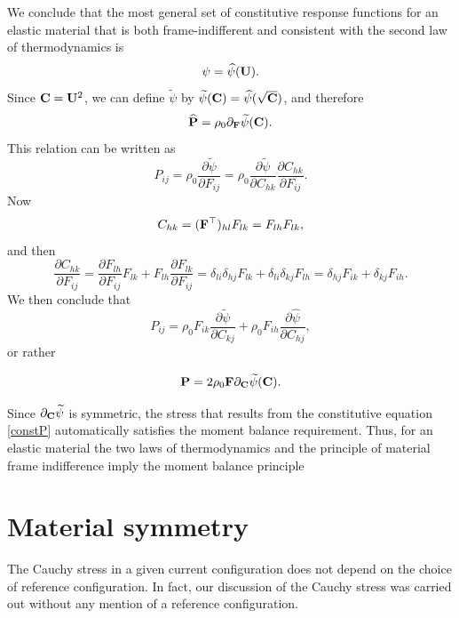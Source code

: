 We conclude that the most general set of constitutive response functions for an elastic material
that is both frame-indifferent and consistent with the second law of thermodynamics is
\begin{equation}
	\psi=\widehat{\psi}(\mathbf{U}).
\end{equation}
Since $\mathbf{C}=\mathbf{U}^2$, we can define $\widetilde{\psi}$ by  $\widetilde{\psi}(\mathbf{C})=\widehat{\psi}(\sqrt{\mathbf{C}})$, and therefore
\begin{equation}
	\widehat{\mathbf{P}}=\rho_0\partial_{\mathbf{F}} \widetilde{\psi}(\mathbf{C}).
\end{equation}
This relation can be written as
\begin{equation}
P_{ij}=\rho_0\frac{\partial \widetilde{\psi}}{\partial F_{ij}}=\rho_0\frac{\partial \widetilde{\psi}}{\partial C_{hk}}\frac{\partial C_{hk}}{\partial F_{ij}}.
\end{equation}
Now
\begin{equation}
	C_{hk}=(\mathbf{F}^\top)_{hl}F_{lk}=F_{lh}F_{lk},
\end{equation}
and then
\begin{equation}
\frac{\partial C_{hk}}{\partial F_{ij}}=\frac{\partial F_{lh}}{\partial F_{ij}}F_{lk}+F_{lh}\frac{\partial F_{lk}}{\partial F_{ij}}=\delta_{li}\delta_{hj}F_{lk}+\delta_{li}\delta_{kj}F_{lh}=
\delta_{hj}F_{ik}+\delta_{kj}F_{ih}.
\end{equation}
We then conclude that
\begin{equation}
P_{ij}=\rho_0F_{ik}\frac{\partial\widetilde{\psi}}{\partial C_{kj}}+\rho_0F_{ih}\frac{\partial\widehat{\psi}}{\partial C_{hj}},
\end{equation}
or rather
\begin{definition}
	\begin{equation}\label{constP}
\mathbf{P}=2\rho_{0}\mathbf{F} \partial_{\mathbf{C}}\widetilde{\psi}(\mathbf{C}).
\end{equation}
\end{definition}

\begin{remark}
Since $\partial_{\mathbf{C}}\widetilde{\psi}$ is symmetric, the stress that results from the constitutive equation  \eqref{constP} automatically satisfies the moment balance requirement.  Thus, for an elastic material the two laws of thermodynamics and the principle of material frame indifference imply
the  moment balance principle
\end{remark}

\section{Material symmetry}
The Cauchy stress in a given current configuration does not depend on the choice of reference  
configuration. In fact, our discussion of the Cauchy stress  
was carried out without any mention of a reference configuration.  



